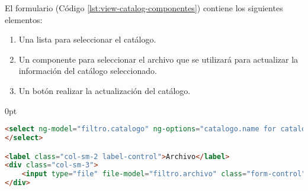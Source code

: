\begin{enumerate}
El formulario (Código \ref{lst:view-catalog-componentes}) contiene los siguientes elementos:
\begin{enumerate}
	\item Una lista para seleccionar el catálogo.
	\item Un componente para seleccionar el archivo que se utilizará para actualizar la información del catálogo seleccionado.
	\item Un botón realizar la actualización del catálogo.
\end{enumerate}
\begin{adjustwidth}{\listingfixwidth}{0pt}
\begin{lstlisting}[language=HTML, captionpos=b, caption={Elementos del formulario para seleccionar catálogo.}, label={lst:view-catalog-componentes}]
<select ng-model="filtro.catalogo" ng-options="catalogo.name for catalogo in catalogos" class="form-control">
</select>

<label class="col-sm-2 label-control">Archivo</label>
<div class="col-sm-3">
	<input type="file" file-model="filtro.archivo" class="form-control"/>
</div>


\end{lstlisting}
\end{adjustwidth}
\end{enumerate}
